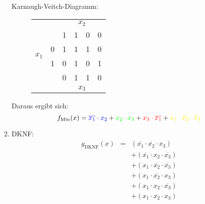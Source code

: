 \documentclass[DIN, pagenumber=false, fontsize=11pt, parskip=half]{scrartcl}
\begin{document}
\begin{enumerate}[label=(\alph*)]
            Karnaugh-Veitch-Diagramm:
            \begin{figure}[H]
                \centering
                \begin{tabular}{cc|cccc}
                    & &  & \multicolumn{2}{c}{$x_2$}\\
                    & & 1 & 1 & 0 & 0\\
                    \midrule
                    \multirow{ 2}{*}{$x_1$} & 0 & \cellcolor{blue!25}1 & \cellcolor{mixtureColor!25}1 & \cellcolor{red!25}1 & 0\\
                     & 1 & 0 & \cellcolor{green!25}1 & 0 & \cellcolor{yellow!25}1\\
                    \midrule
                    & & 0 & 1 & 1 & 0\\
                    & &  & \multicolumn{2}{c}{$x_3$}\\
                \end{tabular}
            \end{figure}
            Daraus ergibt sich:
            \begin{equation*}
                f_\text{Min}(x) = \textcolor{blue}{\overline{x_1}\cdot x_2} + 
                \textcolor{green}{x_2 \cdot x_3} + 
                \textcolor{red}{x_3 \cdot \overline{x_1}}+
                \textcolor{yellow}{x_1 \cdot \overline{x_2} \cdot \overline{x_3}}
            \end{equation*}
        \item
            DKNF:
            \begin{eqnarray*}
                g_\text{DKNF}(x) &=& (\overline{x_1} \cdot \overline{x_2} \cdot x_3)\\
                &&+ (\overline{x_1} \cdot x_2 \cdot \overline{x_3})\\
                &&+ (x_1 \cdot \overline{x_2} \cdot \overline{x_3})\\
                &&+ (x_1 \cdot \overline{x_2} \cdot x_3)\\
                &&+ (x_1 \cdot x_2  \cdot \overline{x_3})\\
                &&+ (x_1 \cdot x_2 \cdot x_3)
            \end{eqnarray*}


\end{enumerate}
\end{document}
